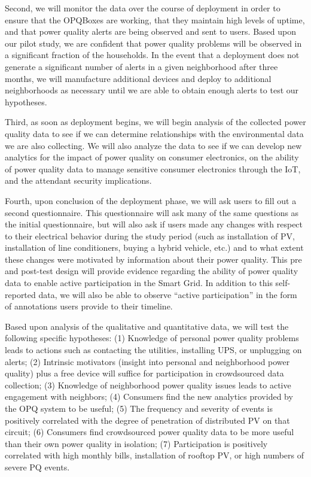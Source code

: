 Second, we will monitor the data over the course of deployment in order to ensure that the OPQBoxes are working, that they maintain high levels of uptime, and that power quality alerts are being observed and sent to users.  Based upon our pilot study, we are confident that power quality problems will be observed in a significant fraction of the households.  In the event that a deployment does not generate a significant number of alerts in a given neighborhood after three months, we will manufacture additional devices and deploy to additional neighborhoods as necessary until we are able to obtain enough alerts to test our hypotheses.

Third, as soon as deployment begins, we will begin analysis of the collected power quality data to see if we can determine relationships with the environmental data we are also collecting. We will also analyze the data to see if we can develop new analytics for the impact of power quality on consumer electronics, on the ability of power quality data to manage sensitive consumer electronics through the IoT, and the attendant security implications. 

Fourth, upon conclusion of the deployment phase, we will ask users to fill out a second questionnaire.  This questionnaire will ask many of the same questions as the initial questionnaire, but will also ask if users made any changes with respect to their electrical behavior during the study period (such as installation of PV, installation of line conditioners, buying a hybrid vehicle, etc.) and to what extent these changes were motivated by information about their power quality.  This pre and post-test design will provide evidence regarding the ability of power quality data to enable active participation in the Smart Grid.  In addition to this self-reported data, we will also be able to observe ``active participation'' in the form of annotations users provide to their timeline.

Based upon analysis of the qualitative and quantitative data, we will test the following specific hypotheses: (1) Knowledge of personal power quality problems leads to actions such as contacting the utilities, installing UPS, or unplugging on alerts; (2) Intrinsic motivators (insight into personal and neighborhood power quality) plus a free device will suffice for participation in crowdsourced data collection; (3) Knowledge of neighborhood power quality issues leads to active engagement with neighbors; (4) Consumers find the new analytics provided by the OPQ system to be useful; (5) The frequency and severity of events is positively correlated with the degree of penetration of distributed PV on that circuit; (6) Consumers find crowdsourced power quality data to be more useful than their own power quality in isolation; (7) Participation is positively correlated with high monthly bills, installation of rooftop PV, or high numbers of severe PQ events.


















